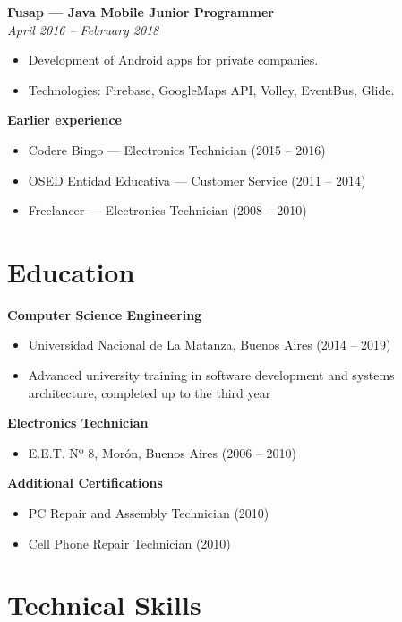 \documentclass[11pt,a4paper]{article}
\newcommand{\jobtitle}[2]{
    \noindent\textbf{#1}\\
    \textit{#2}\par\vspace{0.5em}
}
\begin{document}
\jobtitle{Fusap — Java Mobile Junior Programmer}{April 2016 – February 2018}
\begin{itemize}[leftmargin=*]
    \item Development of Android apps for private companies.
    \item Technologies: Firebase, GoogleMaps API, Volley, EventBus, Glide.
\end{itemize}

\noindent\textbf{Earlier experience}\par\vspace{0.5em}
\begin{itemize}[leftmargin=*]
    \item Codere Bingo — Electronics Technician (2015 – 2016)
    \item OSED Entidad Educativa — Customer Service (2011 – 2014)
    \item Freelancer — Electronics Technician (2008 – 2010)
\end{itemize}

\section{Education}

\textbf{Computer Science Engineering}
\begin{itemize}[leftmargin=*]
    \item Universidad Nacional de La Matanza, Buenos Aires (2014 – 2019)
    \item Advanced university training in software development and systems architecture, completed up to the third year
\end{itemize}

\textbf{Electronics Technician}
\begin{itemize}[leftmargin=*]
    \item E.E.T. Nº 8, Morón, Buenos Aires (2006 – 2010)
\end{itemize}

\textbf{Additional Certifications}
\begin{itemize}[leftmargin=*]
    \item PC Repair and Assembly Technician (2010)
    \item Cell Phone Repair Technician (2010)
\end{itemize}

\section{Technical Skills}
\end{document}
